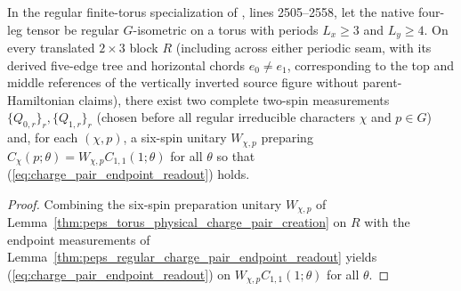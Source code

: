 \begin{lemma}
    \label{thm:peps_torus_physical_charge_pair_readout}
    In the regular finite-torus specialization of \cite{Schuch2010PEPS}, lines 2505--2558, let the native four-leg tensor be regular $G$-isometric on a torus with periods $L_x\ge 3$ and $L_y\ge 4$.
    On every translated $2\times 3$ block $R$ (including across either periodic seam, with its derived five-edge tree and horizontal chords $e_0\neq e_1$, corresponding to the top and middle references of the vertically inverted source figure without parent-Hamiltonian claims), there exist two complete two-spin measurements $\{Q_{0,r}\}_r,\{Q_{1,r}\}_r$ (chosen before all regular irreducible characters $\chi$ and $p\in G$) and, for each $(\chi,p)$, a six-spin unitary $W_{\chi,p}$ preparing $C_\chi(p;\theta)=W_{\chi,p}C_{1,1}(1;\theta)$ for all $\theta$ so that (\ref{eq:charge_pair_endpoint_readout}) holds.
    \leanok
\end{lemma}
\begin{proof}\leanok
    Combining the six-spin preparation unitary $W_{\chi,p}$ of Lemma~\ref{thm:peps_torus_physical_charge_pair_creation} on $R$ with the endpoint measurements of Lemma~\ref{thm:peps_regular_charge_pair_endpoint_readout} yields (\ref{eq:charge_pair_endpoint_readout}) on $W_{\chi,p}C_{1,1}(1;\theta)$ for all $\theta$.
\end{proof}
